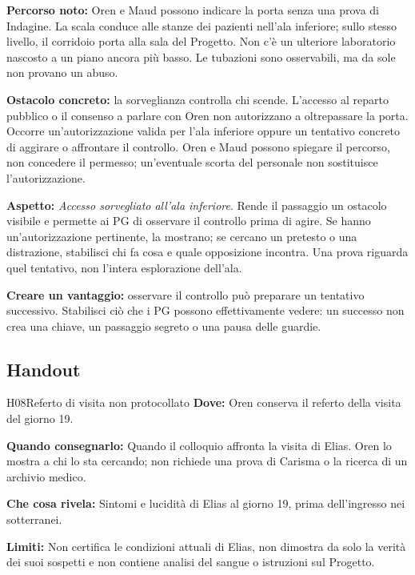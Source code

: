 \documentclass[11pt,a4paper]{article}
\newcommand{\aspect}[1]{\textit{\textcolor{blood}{#1}}}
\begin{document}
\textbf{Percorso noto:} Oren e Maud possono indicare la porta senza una prova di Indagine. La scala conduce alle stanze dei pazienti nell'ala inferiore; sullo stesso livello, il corridoio porta alla sala del Progetto. Non c'è un ulteriore laboratorio nascosto a un piano ancora più basso. Le tubazioni sono osservabili, ma da sole non provano un abuso.

\textbf{Ostacolo concreto:} la sorveglianza controlla chi scende. L'accesso al reparto pubblico o il consenso a parlare con Oren non autorizzano a oltrepassare la porta. Occorre un'autorizzazione valida per l'ala inferiore oppure un tentativo concreto di aggirare o affrontare il controllo. Oren e Maud possono spiegare il percorso, non concedere il permesso; un'eventuale scorta del personale non sostituisce l'autorizzazione.

\begin{fatebox}
\textbf{Aspetto:} \aspect{Accesso sorvegliato all'ala inferiore}. Rende il passaggio un ostacolo visibile e permette ai PG di osservare il controllo prima di agire. Se hanno un'autorizzazione pertinente, la mostrano; se cercano un pretesto o una distrazione, stabilisci chi fa cosa e quale opposizione incontra. Una prova riguarda quel tentativo, non l'intera esplorazione dell'ala.

\textbf{Creare un vantaggio:} osservare il controllo può preparare un tentativo successivo. Stabilisci ciò che i PG possono effettivamente vedere: un successo non crea una chiave, un passaggio segreto o una pausa delle guardie.
\end{fatebox}

\subsection{Handout}
\label{nodo-4-handout}
{}
\begin{handoutbox}{H08}{Referto di visita non protocollato}
\textbf{Dove:} Oren conserva il referto della visita del giorno 19.

\textbf{Quando consegnarlo:} Quando il colloquio affronta la visita di Elias. Oren lo mostra a chi lo sta cercando; non richiede una prova di Carisma o la ricerca di un archivio medico.

\textbf{Che cosa rivela:} Sintomi e lucidità di Elias al giorno 19, prima dell'ingresso nei sotterranei.

\textbf{Limiti:} Non certifica le condizioni attuali di Elias, non dimostra da solo la verità dei suoi sospetti e non contiene analisi del sangue o istruzioni sul Progetto.
\end{handoutbox}
\end{document}
